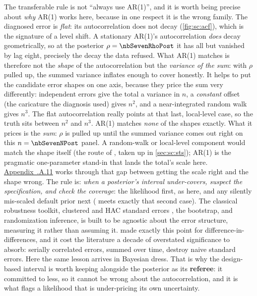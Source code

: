 The transferable rule is not ``always use AR(1)'', and it is worth being precise about \emph{why}
AR(1) works here, because in one respect it is the wrong family. The diagnosed error is \emph{flat}:
its autocorrelation does not decay (\cref{fig:sc:acf}), which is the signature of a level shift. A
stationary AR(1)'s autocorrelation \emph{does} decay geometrically, so at the posterior
$\rho = \nbSevenRhoPost$ it has all but vanished by lag eight, precisely the decay the data refused.
What AR(1) matches is therefore not the \emph{shape} of the autocorrelation but the \emph{variance of
the sum}: with $\rho$ pulled up, the summed variance inflates enough to cover honestly. It helps to
put the candidate error shapes on one axis, because they price the sum very differently: independent
errors give the total a variance in $n$, a \emph{constant} offset (the caricature the diagnosis used)
gives $n^2$, and a near-integrated random walk gives $n^3$. The flat autocorrelation really points at
that last, local-level case, so the truth sits between $n^2$ and $n^3$. AR(1) matches \emph{none} of
the shapes exactly. What it prices is the \emph{sum}: $\rho$ is pulled up until the summed variance
comes out right on this $n = \nbSevenNPost$ panel. A random-walk or local-level component would match the shape itself
(the route of \citet{brodersen2015}, taken up in \cref{sec:sc:sts}); AR(1) is the pragmatic
one-parameter stand-in that lands the total's scale here.
\hyperref[app:sc:acf]{Appendix~\thechapter.A.11} works through that gap between getting the scale right
and the shape wrong. The rule is: \emph{when a
posterior's interval under-covers, suspect the specification, and check the coverage}: the
likelihood first, as here, and any silently mis-scaled default prior next
( meets exactly that second case). The classical robustness
toolkit, clustered and HAC standard errors \citep{newey1987, bertrand2004}, the bootstrap, and
randomization inference, is built to be agnostic about the error structure, measuring it rather
than assuming it.  made exactly this point for difference-in-differences, and
it cost the literature a decade of overstated significance to absorb: serially correlated errors,
summed over time, destroy naive standard errors. Here the same lesson arrives in Bayesian dress.
That is why the design-based interval is worth keeping alongside the posterior as its
\textbf{referee}: it committed to less, so it cannot be wrong about the autocorrelation, and it is
what flags a likelihood that is under-pricing its own uncertainty.

